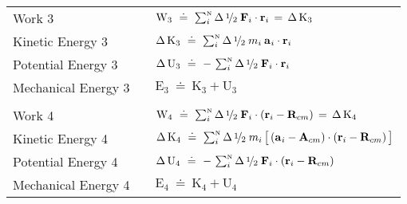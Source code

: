 \documentclass[10pt]{article}
\newcommand{\med}{\raise.5ex\hbox{$\scriptstyle 1$}\kern-.15em/\kern-.09em\lower.25ex\hbox{$\scriptstyle 2$}}
\begin{document}
\par \bigskip\bigskip \hspace{-2.40em} \begin{tabular}{lll}
Work 3 & \hspace{+0.33em} & ${\mathrm{W}}_3 ~\doteq~ \sum_i^{\scriptscriptstyle{\mathrm{N}}} \Delta \, \med \; {\mathbf{F}}_i \cdot {\mathbf{r}}_{i} \,=\, \Delta \, {\mathrm{K}}_3$ \vspace{+0.99em} \\
Kinetic Energy 3 & \hspace{+0.33em} & $\Delta \, {\mathrm{K}}_3 ~\doteq~ \sum_i^{\scriptscriptstyle{\mathrm{N}}} \Delta \, \med \; m_i \: {\mathbf{a}}_{\hspace{+0.045em}i} \cdot {\mathbf{r}}_{i}$ \vspace{+0.99em} \\
Potential Energy 3 & \hspace{+0.33em} & $\Delta \, {\mathrm{U}}_3 ~\doteq~ - \, \sum_i^{\scriptscriptstyle{\mathrm{N}}} \Delta \, \med \; {\mathbf{F}}_i \cdot {\mathbf{r}}_{i}$ \vspace{+0.99em} \\
Mechanical Energy 3 & \hspace{+0.33em} & ${\mathrm{E}}_3 ~\doteq~ {\mathrm{K}}_3 + {\mathrm{U}}_3$ \vspace{+0.99em} \\
\\
Work 4 & \hspace{+0.33em} & ${\mathrm{W}}_4 ~\doteq~ \sum_i^{\scriptscriptstyle{\mathrm{N}}} \Delta \, \med \; {\mathbf{F}}_i \cdot ({\mathbf{r}}_{i} - {\mathbf{R}}_{cm}) \,=\, \Delta \, {\mathrm{K}}_4$ \vspace{+0.99em} \\
Kinetic Energy 4 & \hspace{+0.33em} & $\Delta \, {\mathrm{K}}_4 ~\doteq~ \sum_i^{\scriptscriptstyle{\mathrm{N}}} \Delta \, \med \; m_i \, \big [ \, ({\mathbf{a}}_{\hspace{+0.045em}i} - {\mathbf{A}}_{cm}) \cdot ({\mathbf{r}}_{i} - {\mathbf{R}}_{cm}) \, \big ]$ \vspace{+0.99em} \\
Potential Energy 4 & \hspace{+0.33em} & $\Delta \, {\mathrm{U}}_4 ~\doteq~ - \, \sum_i^{\scriptscriptstyle{\mathrm{N}}} \Delta \, \med \; {\mathbf{F}}_i \cdot ({\mathbf{r}}_{i} - {\mathbf{R}}_{cm})$ \vspace{+0.99em} \\
Mechanical Energy 4 & \hspace{+0.33em} & ${\mathrm{E}}_4 ~\doteq~ {\mathrm{K}}_4 + {\mathrm{U}}_4$ \vspace{+0.99em} \\

\end{tabular}
\end{document}
